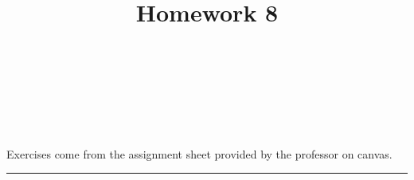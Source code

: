 \documentclass[10pt]{amsart}
\theoremstyle{nonumberplain}
\begin{document}
\pagestyle{empty}

\newcommand{\mline}{\vspace{.2in}\hrule\vspace{.2in}}

\noindent
{} \\
 \\
 \\
 \\

\title{\bf {Homework 8} }


\maketitle
\noindent
Exercises come from the assignment sheet provided by the professor on canvas.
\mline
\end{document}
